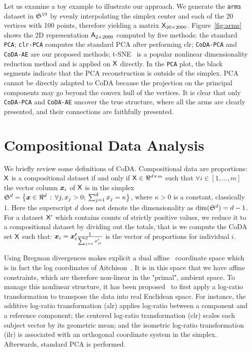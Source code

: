 \documentclass{article}
\begin{document}
Let us examine a toy example to illustrate our approach.
We generate the \texttt{arms} dataset in $\mathfrak{S}^{19}$
by evenly interpolating the simplex center and each of the 20 vertices with 100 points,
therefore yielding a matrix $\mathsf{X}_{20\times2000}$.
Figure~\ref{fig:arms} shows the 2D representation
$\mathsf{A}_{2\times2000}$ computed by five methods:
the standard \texttt{PCA};
\texttt{clr-PCA} computes the standard PCA after performing clr;
\texttt{CoDA-PCA} and \texttt{CoDA-AE} are our proposed methods;
t-SNE~\cite{maaten08} is a popular nonlinear dimensionality reduction
method and is applied on $\mathsf{X}$ directly.
In the \texttt{PCA} plot, the black segments indicate that
the PCA reconstruction is outside of the simplex. PCA cannot be directly adapted to CoDA
because the projection on the principal components may go beyond the convex hull of the vertices.
It is clear that only \texttt{CoDA-PCA} and \texttt{CoDA-AE} uncover
the true structure,
where all the arms are clearly presented, and their connections are faithfully presented.

\section{Compositional Data Analysis}

We briefly review some definitions of CoDA.
Compositional data are proportions: $\mathsf{X}$ is a compositional dataset if and only if
$\mathsf{X}\in\Re^{d\times m}$ such that $\forall{i}\in [1,...,m]$ the vector column
$\bm{x}_i$ of $\mathsf{X}$ is in the simplex
$\mathfrak{S}^d=\big\{\bm{x}\in\Re^d\,:\,\forall{j}, x_j> 0;\:\sum_{j=1}^d{x}_j=\kappa\big\}$,
where $\kappa>0$ is a constant, classically $1$.
Here the superscript $d$ does not denote the dimensionality as $\dim(\mathfrak{S}^d)=d-1$.
For a dataset $\mathsf{X}'$ which contains counts of strictly positive values,
we reduce it to a compositional dataset by dividing out the totals, that is
we compute the CoDA set $\mathsf{X}$ such that:
$\bm{x}_i=\bm{x'}_i\frac{1}{\sum_{j=1}^dx'_{ji}}$
is the vector of proportions for individual $i$.

Using Bregman divergences makes explicit a dual affine~\cite{aIG}
coordinate space which is in fact the log coordinates of Aitchison~\cite{aTSJ}.
It is in this space that we have affine constraints, which are therefore non-linear
in the "primal", ambient space.
To manage this nonlinear structure,
it has been proposed~\cite{aPO} to first apply a log-ratio transformation to transpose the data into real Euclidean space. For instance, the additive log-ratio transformation (alr) applies log-ratio between a component and a reference component; the centered log-ratio transformation (clr) scales each subject vector by its geometric mean; and the isometric log-ratio transformation (ilr) is associated with an orthogonal coordinate system in the simplex.
Afterwards, standard PCA is performed.
\end{document}

